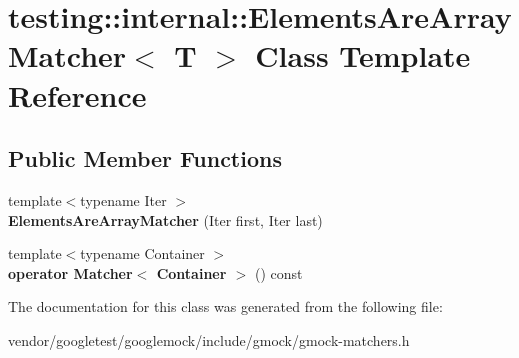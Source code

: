 \hypertarget{classtesting_1_1internal_1_1ElementsAreArrayMatcher}{}\section{testing\+:\+:internal\+:\+:Elements\+Are\+Array\+Matcher$<$ T $>$ Class Template Reference}
\label{classtesting_1_1internal_1_1ElementsAreArrayMatcher}
\subsection*{Public Member Functions}
\begin{DoxyCompactItemize}
\item 
{\footnotesize template$<$typename Iter $>$ }\\{\bfseries Elements\+Are\+Array\+Matcher} (Iter first, Iter last)\hypertarget{classtesting_1_1internal_1_1ElementsAreArrayMatcher_aa076a0583c29dc7da6107775bba73be8}{}\label{classtesting_1_1internal_1_1ElementsAreArrayMatcher_aa076a0583c29dc7da6107775bba73be8}

\item 
{\footnotesize template$<$typename Container $>$ }\\{\bfseries operator Matcher$<$ Container $>$} () const \hypertarget{classtesting_1_1internal_1_1ElementsAreArrayMatcher_a2d1e4ae0b795824282a07aff40e1d480}{}\label{classtesting_1_1internal_1_1ElementsAreArrayMatcher_a2d1e4ae0b795824282a07aff40e1d480}

\end{DoxyCompactItemize}


The documentation for this class was generated from the following file\+:\begin{DoxyCompactItemize}
\item 
vendor/googletest/googlemock/include/gmock/gmock-\/matchers.\+h\end{DoxyCompactItemize}
